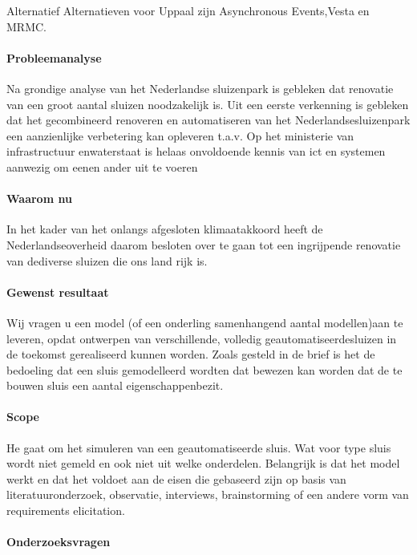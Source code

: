 Alternatief
Alternatieven voor Uppaal zijn Asynchronous Events,Vesta en MRMC.

\paragraph{Probleemanalyse}

Na grondige analyse van het Nederlandse sluizenpark is gebleken dat renovatie van een groot aantal sluizen noodzakelijk is.  Uit een eerste verkenning is gebleken  dat het gecombineerd renoveren en automatiseren van het Nederlandsesluizenpark een aanzienlijke verbetering kan opleveren t.a.v. 
Op  het  ministerie  van  infrastructuur  enwaterstaat is helaas onvoldoende kennis van ict en systemen aanwezig om eenen ander uit te voeren 

\paragraph{Waarom nu}
In  het  kader  van  het  onlangs  afgesloten  klimaatakkoord  heeft  de  Nederlandseoverheid  daarom  besloten  over  te  gaan  tot  een  ingrijpende  renovatie  van  dediverse  sluizen  die  ons  land  rijk  is.     

\paragraph{Gewenst resultaat }


Wij vragen u een model (of een onderling samenhangend aantal modellen)aan  te  leveren,  opdat  ontwerpen  van  verschillende,  volledig  geautomatiseerdesluizen in de toekomst gerealiseerd kunnen worden. 
Zoals  gesteld  in  de  brief  is  het  de  bedoeling  dat  een  sluis  gemodelleerd  wordten  dat  bewezen  kan  worden  dat  de  te  bouwen  sluis  een  aantal  eigenschappenbezit.  

\paragraph{Scope}

He gaat om het simuleren van een geautomatiseerde sluis. Wat voor type sluis wordt niet gemeld en ook niet uit welke onderdelen. Belangrijk is dat het model werkt en dat het voldoet aan de eisen die gebaseerd zijn op basis van literatuuronderzoek, observatie, interviews, brainstorming of een andere vorm van requirements elicitation.

\paragraph{Onderzoeksvragen }

